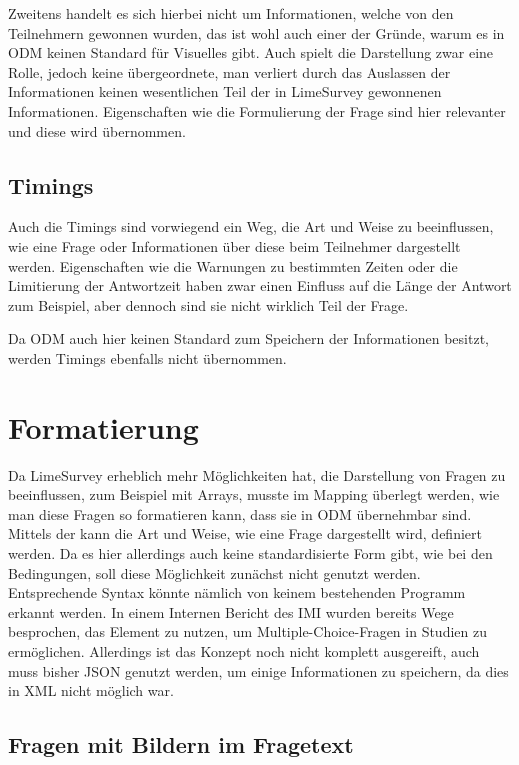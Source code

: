 Zweitens handelt es sich hierbei nicht um Informationen, welche von den Teilnehmern gewonnen wurden, das ist wohl auch einer der Gründe, warum es in ODM keinen Standard für Visuelles gibt.
Auch spielt die Darstellung zwar eine Rolle, jedoch keine übergeordnete, man verliert durch das Auslassen der Informationen keinen wesentlichen Teil der in LimeSurvey gewonnenen Informationen.
Eigenschaften wie die Formulierung der Frage sind hier relevanter und diese wird übernommen.

\subsection{Timings}

Auch die Timings sind vorwiegend ein Weg, die Art und Weise zu beeinflussen, wie eine Frage oder Informationen über diese beim Teilnehmer dargestellt werden.
Eigenschaften wie die Warnungen zu bestimmten Zeiten oder die Limitierung der Antwortzeit haben zwar einen Einfluss auf die Länge der Antwort zum Beispiel, aber dennoch sind sie nicht wirklich Teil der Frage.

Da ODM auch hier keinen Standard zum Speichern der Informationen besitzt, werden Timings ebenfalls nicht übernommen.

\section{Formatierung}

Da LimeSurvey erheblich mehr Möglichkeiten hat, die Darstellung von Fragen zu beeinflussen, zum Beispiel mit Arrays, musste im Mapping überlegt werden, wie man diese Fragen so formatieren kann, dass sie in ODM übernehmbar sind.
Mittels der  kann die Art und Weise, wie eine Frage dargestellt wird, definiert werden.
Da es hier allerdings auch keine standardisierte Form gibt, wie bei den Bedingungen, soll diese Möglichkeit zunächst nicht genutzt werden.
Entsprechende Syntax könnte nämlich von keinem bestehenden Programm erkannt werden.
In einem Internen Bericht des IMI wurden bereits Wege besprochen, das  Element zu nutzen, um Multiple-Choice-Fragen in Studien zu ermöglichen.
Allerdings ist das Konzept noch nicht komplett ausgereift, auch muss bisher JSON genutzt werden, um einige Informationen zu speichern, da dies in XML nicht möglich war.

\subsection{Fragen mit Bildern im Fragetext}

